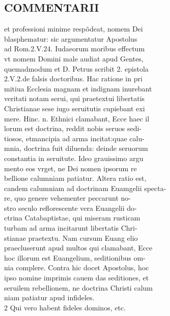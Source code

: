 \documentclass{article}
\begin{document}
\begin{pages}
\section*{COMMENTARII \\
                }et professioni minime respõdeat, nomem Dei \\
                blasphematur: sic argumentatur Apostolus \\
                ad Rom.2.V.24. Iudaeorum moribus effectum \\
                vt nomem Domini male audiat apud Gentes, \\
                quemadmodum et D. Petrus scribit 2. epistola \\
                2.V.2.de falsis doctoribus. Hac ratione in pri \\
                mitiua Ecclesia magnam et indignam inurebant \\
                veritati notam serui, qui praetextui libertatis \\
                Christianae sese iugo seruitutis cupiebant exi \\
                mere. Hinc. n. Ethnici clamabant, Ecce haec il \\
                lorum est doctrina, reddit nobis seruos sedi- \\
                tiosos, etmancipia ad arma incitat:quae calu- \\
                mnia, doctrina fuit diluenda: deinde seruorum \\
                constantia in seruitute. Ideo grauissimo argu \\
                mento eos vrget, ne Dei nomen ipsorum re \\
                bellione calumniam patiatur. Altera ratio est, \\
                candem calumniam ad doctrinam Euamgelii specta- \\
                re, quo genere vehementer peccarunt no- \\
                stro seculo reflorescente vera Euangelii do- \\
                ctrina Catabaptistae, qui miseram rusticam \\
                turbam ad arma incitarunt libertatis Chri- \\
                stianae praetextu. Nam cursum Euang elio \\
                praecluserunt apud multos qui clamabant, Ecce \\
                hoc illorum est Euangelium, seditionibus om- \\
                nia complere. Contra hic docet Apostolus, hoc \\
                ipso nomine imprimis cauem das seditiones, et \\
                seruilem rebellionem, ne doctrina Christi calum \\
                niam patiatur apud infideles. \\
                2 Qui vero habent fideles dominos, etc. \\
                

\end{pages}
\end{document}

